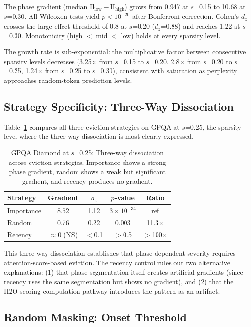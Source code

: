\documentclass[11pt,a4paper]{article}
\begin{document}
The phase gradient (median $\text{II}_\text{low} - \text{II}_\text{high}$) grows from 0.947 at $s$=0.15 to 10.68 at $s$=0.30. All Wilcoxon tests yield $p < 10^{-20}$ after Bonferroni correction. Cohen's $d_z$ crosses the large-effect threshold of 0.8 at $s$=0.20 ($d_z$=0.88) and reaches 1.22 at $s$=0.30. Monotonicity (high $<$ mid $<$ low) holds at every sparsity level.

The growth rate is sub-exponential: the multiplicative factor between consecutive sparsity levels decreases (3.25$\times$ from $s$=0.15 to $s$=0.20, 2.8$\times$ from $s$=0.20 to $s$=0.25, 1.24$\times$ from $s$=0.25 to $s$=0.30), consistent with saturation as perplexity approaches random-token prediction levels.

\subsection{Strategy Specificity: Three-Way Dissociation}

Table~\ref{tab:gpqa_strategies} compares all three eviction strategies on GPQA at $s$=0.25, the sparsity level where the three-way dissociation is most clearly expressed.

\begin{table}[h]
\centering
\caption{GPQA Diamond at $s$=0.25: Three-way dissociation across eviction strategies. Importance shows a strong phase gradient, random shows a weak but significant gradient, and recency produces no gradient.}
\label{tab:gpqa_strategies}
\begin{tabular}{lcccc}
\toprule
Strategy & Gradient & $d_z$ & $p$-value & Ratio \\
\midrule
Importance & 8.62 & 1.12 & $3 \times 10^{-34}$ & ref \\
Random & 0.76 & 0.22 & 0.003 & 11.3$\times$ \\
Recency & $\approx$0 (NS) & $<$0.1 & $>$0.5 & $>$100$\times$ \\
\bottomrule
\end{tabular}
\end{table}

This three-way dissociation establishes that phase-dependent severity requires attention-score-based eviction. The recency control rules out two alternative explanations: (1) that phase segmentation itself creates artificial gradients (since recency uses the same segmentation but shows no gradient), and (2) that the H2O scoring computation pathway introduces the pattern as an artifact.

\subsection{Random Masking: Onset Threshold}
\end{document}
